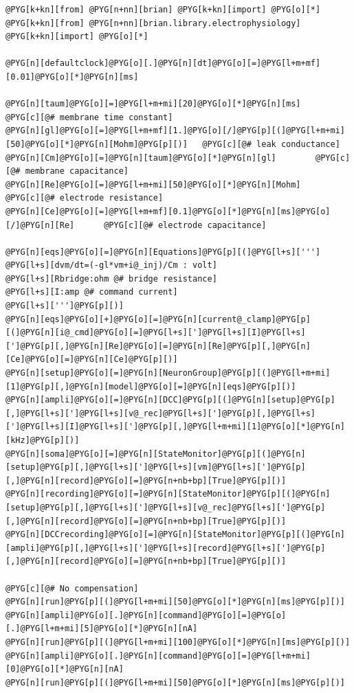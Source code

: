 \documentclass[letterpaper,10pt,english]{manual}
\begin{document}
\begin{Verbatim}[commandchars=@\[\]]
@PYG[k+kn][from] @PYG[n+nn][brian] @PYG[k+kn][import] @PYG[o][*]
@PYG[k+kn][from] @PYG[n+nn][brian.library.electrophysiology] @PYG[k+kn][import] @PYG[o][*]

@PYG[n][defaultclock]@PYG[o][.]@PYG[n][dt]@PYG[o][=]@PYG[l+m+mf][0.01]@PYG[o][*]@PYG[n][ms]

@PYG[n][taum]@PYG[o][=]@PYG[l+m+mi][20]@PYG[o][*]@PYG[n][ms]        @PYG[c][@# membrane time constant]
@PYG[n][gl]@PYG[o][=]@PYG[l+m+mf][1.]@PYG[o][/]@PYG[p][(]@PYG[l+m+mi][50]@PYG[o][*]@PYG[n][Mohm]@PYG[p][)]   @PYG[c][@# leak conductance]
@PYG[n][Cm]@PYG[o][=]@PYG[n][taum]@PYG[o][*]@PYG[n][gl]        @PYG[c][@# membrane capacitance]
@PYG[n][Re]@PYG[o][=]@PYG[l+m+mi][50]@PYG[o][*]@PYG[n][Mohm]        @PYG[c][@# electrode resistance]
@PYG[n][Ce]@PYG[o][=]@PYG[l+m+mf][0.1]@PYG[o][*]@PYG[n][ms]@PYG[o][/]@PYG[n][Re]      @PYG[c][@# electrode capacitance]

@PYG[n][eqs]@PYG[o][=]@PYG[n][Equations]@PYG[p][(]@PYG[l+s][''']
@PYG[l+s][dvm/dt=(-gl*vm+i@_inj)/Cm : volt]
@PYG[l+s][Rbridge:ohm @# bridge resistance]
@PYG[l+s][I:amp @# command current]
@PYG[l+s][''']@PYG[p][)]
@PYG[n][eqs]@PYG[o][+]@PYG[o][=]@PYG[n][current@_clamp]@PYG[p][(]@PYG[n][i@_cmd]@PYG[o][=]@PYG[l+s][']@PYG[l+s][I]@PYG[l+s][']@PYG[p][,]@PYG[n][Re]@PYG[o][=]@PYG[n][Re]@PYG[p][,]@PYG[n][Ce]@PYG[o][=]@PYG[n][Ce]@PYG[p][)]
@PYG[n][setup]@PYG[o][=]@PYG[n][NeuronGroup]@PYG[p][(]@PYG[l+m+mi][1]@PYG[p][,]@PYG[n][model]@PYG[o][=]@PYG[n][eqs]@PYG[p][)]
@PYG[n][ampli]@PYG[o][=]@PYG[n][DCC]@PYG[p][(]@PYG[n][setup]@PYG[p][,]@PYG[l+s][']@PYG[l+s][v@_rec]@PYG[l+s][']@PYG[p][,]@PYG[l+s][']@PYG[l+s][I]@PYG[l+s][']@PYG[p][,]@PYG[l+m+mi][1]@PYG[o][*]@PYG[n][kHz]@PYG[p][)]
@PYG[n][soma]@PYG[o][=]@PYG[n][StateMonitor]@PYG[p][(]@PYG[n][setup]@PYG[p][,]@PYG[l+s][']@PYG[l+s][vm]@PYG[l+s][']@PYG[p][,]@PYG[n][record]@PYG[o][=]@PYG[n+nb+bp][True]@PYG[p][)]
@PYG[n][recording]@PYG[o][=]@PYG[n][StateMonitor]@PYG[p][(]@PYG[n][setup]@PYG[p][,]@PYG[l+s][']@PYG[l+s][v@_rec]@PYG[l+s][']@PYG[p][,]@PYG[n][record]@PYG[o][=]@PYG[n+nb+bp][True]@PYG[p][)]
@PYG[n][DCCrecording]@PYG[o][=]@PYG[n][StateMonitor]@PYG[p][(]@PYG[n][ampli]@PYG[p][,]@PYG[l+s][']@PYG[l+s][record]@PYG[l+s][']@PYG[p][,]@PYG[n][record]@PYG[o][=]@PYG[n+nb+bp][True]@PYG[p][)]

@PYG[c][@# No compensation]
@PYG[n][run]@PYG[p][(]@PYG[l+m+mi][50]@PYG[o][*]@PYG[n][ms]@PYG[p][)]
@PYG[n][ampli]@PYG[o][.]@PYG[n][command]@PYG[o][=]@PYG[o][.]@PYG[l+m+mi][5]@PYG[o][*]@PYG[n][nA]
@PYG[n][run]@PYG[p][(]@PYG[l+m+mi][100]@PYG[o][*]@PYG[n][ms]@PYG[p][)]
@PYG[n][ampli]@PYG[o][.]@PYG[n][command]@PYG[o][=]@PYG[l+m+mi][0]@PYG[o][*]@PYG[n][nA]
@PYG[n][run]@PYG[p][(]@PYG[l+m+mi][50]@PYG[o][*]@PYG[n][ms]@PYG[p][)]


\end{Verbatim}
\end{document}
